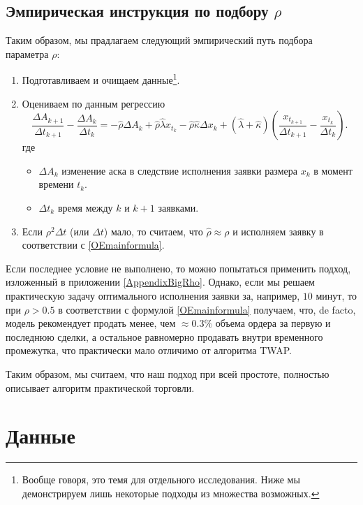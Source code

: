 \subsection{Эмпирическая инструкция по подбору $\rho$}
Таким образом, мы прадлагаем следующий эмпирический путь подбора параметра $\rho$:
\begin{enumerate}
    \item Подготавливаем и очищаем данные\footnote{Вообще говоря, это темя для отдельного исследования. 
    Ниже мы демонстрируем лишь некоторые подходы из множества возможных.}. 
    \item Оцениваем по данным регрессию
    \begin{equation*}
        \frac{\Delta A_{k+1}}{\Delta t_{k+1}} - \frac{\Delta A_{k}}{\Delta t_{k}} =
        -\hat \rho \Delta A_k + \hat \rho \hat \lambda x_{t_k} - \hat \rho \hat \kappa \Delta x_k
        + (\hat \lambda + \hat \kappa) \left(\frac{x_{t_{k+1}}}{\Delta t_{k+1}} - \frac{x_{t_k}}{\Delta t_{k}}\right).
    \end{equation*}
    где
    \begin{itemize}
        \item $\Delta A_{k}$ изменение аска в следствие исполнения заявки размера $x_k$ в момент времени $t_k$.
        \item $\Delta t_{k}$ время между $k$ и $k + 1$ заявками.
    \end{itemize}
    \item Если $\rho^2 \Delta t$ (или $\Delta t$) мало, то считаем, 
    что $\hat \rho \approx \rho$ и исполняем заявку в соответствии с \eqref{OEmainformula}.
\end{enumerate}
Если последнее условие не выполнено, то можно попытаться применить подход, изложенный в приложении \ref{AppendixBigRho}.
Однако, если мы решаем практическую задачу оптимального исполнения заявки за, например, $10$ минут, то при $\rho > 0.5$ 
в соответствии с формулой \eqref{OEmainformula} получаем, что, de facto, модель рекомендует продать менее, чем $\approx 0.3\%$ объема
ордера за первую и последнюю сделки, а остальное равномерно продавать внутри временного промежутка, что практически мало отличимо от 
алгоритма TWAP. 
\par
Таким образом, мы считаем, что наш подход при всей простоте, полностью описывает алгоритм практической торговли. 


\section{Данные}
